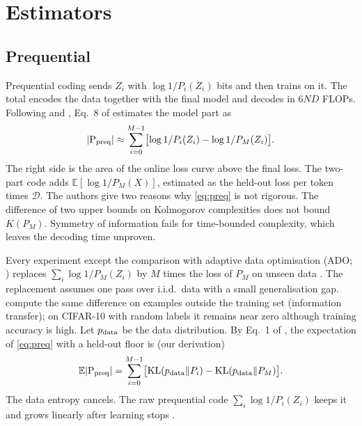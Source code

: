\documentclass[11pt]{article}
\newcommand{\E}{\mathbb{E}}\newcommand{\N}{\mathbb{N}}\newcommand{\R}{\mathbb{R}}
\newcommand{\Dt}{\mathcal{D}}\newcommand{\PT}{\mathcal{P}_T}\newcommand{\prog}{\mathrm{P}}
\newcommand{\KL}{\mathrm{KL}}\newcommand{\MDL}{\mathrm{MDL}}\newcommand{\Poly}{\mathrm{Poly}}
\theoremstyle{tight}
\begin{document}
\section{Estimators}\label{sec:est}
\subsection{Prequential}\label{sec:preq}
Prequential coding \citep{dawid1984} sends $Z_i$ with $\log1/P_i(Z_i)$ bits and then trains on it.
The total encodes the data together with the final model and decodes in $6ND$ FLOPs. Following
\citet{zhang2020transfer} and \citet{finzi2025computeoptimal}, Eq.~8 of \citet{finzi2026epiplexity}
estimates the model part as
\begin{equation}\label{eq:preq}
|\prog_{\rm preq}|\approx\sum_{i=0}^{M-1}\bigl[\log1/P_i(Z_i)-\log1/P_M(Z_i)\bigr].
\end{equation}
The right side is the area of the online loss curve above the final loss. The two-part code adds
$\E[\log1/P_M(X)]$, estimated as the held-out loss per token times $\Dt$. The authors give two reasons
why \eqref{eq:preq} is not rigorous. The difference of two upper bounds on Kolmogorov complexities does
not bound $K(P_M)$. Symmetry of information fails for time-bounded complexity, which leaves the
decoding time unproven.

Every experiment except the comparison with adaptive data optimisation (ADO; \citealp{jiang2025ado})
replaces $\sum_i\log1/P_M(Z_i)$ by $M$ times the loss of
$P_M$ on unseen data \citep[App.~B.1]{finzi2026epiplexity}. The replacement assumes one pass over
i.i.d.\ data with a small generalisation gap. \citet{zhang2020transfer} compute the same difference on
examples outside the training set (information transfer); on CIFAR-10 with random labels it remains
near zero although training accuracy is high. Let $p_{\rm data}$ be the data distribution. By Eq.~1
of \citet{qiu2026requential}, the expectation of \eqref{eq:preq} with a held-out floor is (our
derivation)
\begin{equation}\label{eq:preqkl}
\E|\prog_{\rm preq}|=\sum_{i=0}^{M-1}\bigl[\KL(p_{\rm data}\|P_i)-\KL(p_{\rm data}\|P_M)\bigr].
\end{equation}
The data entropy cancels. The raw prequential code $\sum_i\log1/P_i(Z_i)$ keeps it and grows linearly
after learning stops \citep{qiu2026requential}.
\end{document}
